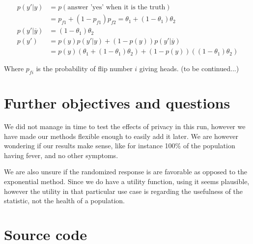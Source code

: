 \documentclass{article}
\begin{document}
\begin{equation}
    \begin{split}
        p(y'|y) &= p(\text{answer 'yes' when it is the truth})\\
 &= p_{f1} + (1-p_{f1})p_{f2} = \theta_1 + (1-\theta_1)\theta_2\\
p(y'|\overline{y}) &= (1-\theta_1)\theta_2\\
p(y') &= p(y)p(y'|y) + (1-p(y))p(y'|\overline{y})\\
&= p(y)(\theta_1 + (1-\theta_1)\theta_2) + (1-p(y))((1-\theta_1)\theta_2)
\end{split}
\end{equation}

Where $p_{fi}$ is the probability of flip number $i$ giving heads. (to be continued...)

\section{Further objectives and questions}
We did not manage in time to test the effects of privacy in this run, however we have 
made our methods flexible enough to easily add it later. We are however wondering if our results
make sense, like for instance 100\% of the population having fever, and no other symptoms.

We are also unsure if the randomized response is are favorable as opposed to the exponential method.
Since we do have a utility function, using it seems plausible, however the utility in that particular use
case is regarding the usefulness of the statistic, not the health of a population.

\section{Source code}

\end{document}
